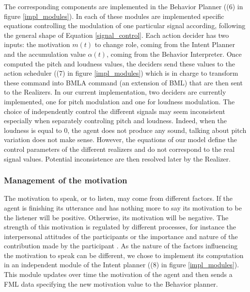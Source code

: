 The corresponding components are implemented in the Behavior Planner ((6) in figure \ref{impl_modules}). In each of these modules are implemented specific equations controlling the modulation of one particular signal according, following the general shape of Equation \ref{signal_control}. Each action decider has two inputs: the motivation $m(t)$ to change role, coming from the Intent Planner and the accumulation value $\alpha(t)$, coming from the Behavior Interpreter. 
Once computed the pitch and loudness values, the deciders send these values to the action scheduler ((7) in figure \ref{impl_modules}) which is in charge to transform these command into BMLA command (an extension of BML) that are then sent to the Realizers. 
In our current implementation, two deciders are currently implemented, one for pitch modulation and one for loudness modulation. 
The choice of independently control the different signals may seem inconsistent especially when separately controling pitch and loudness. Indeed, when the loudness is equal to $0$, the agent does not produce any sound, talking about pitch variation does not make sense. However, the equations of our model define the control parameters of the different realizers and do not correspond to the real signal values. Potential inconsistence are then resolved later by the Realizer.  


\subsubsection{Management of the motivation}

The motivation to speak, or to listen, may come from different factors. If the agent is finishing its utterance and has nothing more to say its motivation to be the listener will be positive. Otherwise, its motivation will be negative. The strength of this motivation is regulated by different processes, for instance the interpersonal attitudes of the participants \citep{ter_maat_how_2010,ravenet_conversational_2015} or the importance and nature of the contribution made by the participant \citep{cafaro_effects_2016}. As the nature of the factors influencing the motivation to speak can be different, we chose to implement its computation in an independent module of the Intent planner ((8) in figure \ref{impl_modules}). This module updates over time the motivation of the agent and then sends a FML data specifying the new motivation value to the Behavior planner. 


